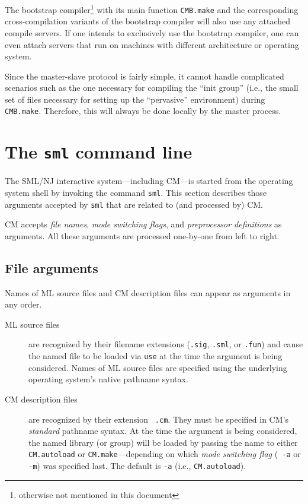\documentclass[titlepage,letterpaper]{article}
\begin{document}
The bootstrap compiler\footnote{otherwise not mentioned in this
document} with its main function {\tt CMB.make} and the corresponding
cross-compilation variants of the bootstrap compiler will also use any
attached compile servers.  If one intends to exclusively use the
bootstrap compiler, one can even attach servers that run on machines
with different architecture or operating system.

Since the master-slave protocol is fairly simple, it cannot handle
complicated scenarios such as the one necessary for compiling the
``init group'' (i.e., the small set of files necessary for setting up
the ``pervasive'' environment) during {\tt CMB.make}.  Therefore, this
will always be done locally by the master process.

\section{The {\tt sml} command line}

The SML/NJ interactive system---including CM---is started from the
operating system shell by invoking the command {\tt sml}.
This section describes those arguments accepted by {\tt sml} that
are related to (and processed by) CM.

CM accepts {\em file names}, {\em mode switching flags}, and {\em
preprocessor definitions} as arguments.  All these arguments are
processed one-by-one from left to right.

\subsection{File arguments}

Names of ML source files and CM description files can appear as
arguments in any order.

\begin{description}
\item[ML source files] are recognized by their filename extensions
({\tt .sig}, {\tt .sml}, or {\tt .fun}) and cause the named file to be
loaded via {\tt use} at the time the argument is being considered.
Names of ML source files are specified using the underlying operating
system's native pathname syntax.
\item[CM description files] are recognized by their extension {\tt
.cm}.  They must be specified in CM's {\em standard} pathname syntax.
At the time the argument is being considered, the named library (or
group) will be loaded by passing the name to either {\tt CM.autoload}
or {\tt CM.make}---depending on which {\em mode switching flag} ({\tt
-a} or {\tt -m}) was specified last.  The default is {\tt -a} (i.e.,
{\tt CM.autoload}).
\end{description}
\end{document}
